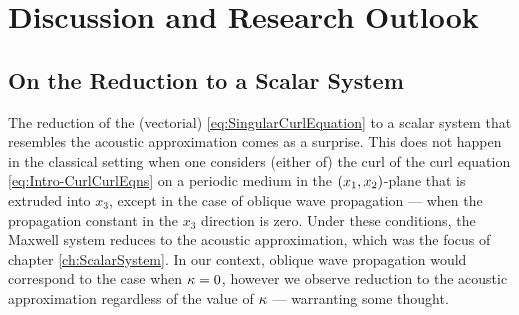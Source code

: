 \section{Discussion and Research Outlook} \label{sec:CC-Discussion}

\subsection{On the Reduction to a Scalar System} \label{ssec:ReductionToScalar}
The reduction of the (vectorial) \eqref{eq:SingularCurlEquation} to a scalar system that resembles the acoustic approximation comes as a surprise.
This does not happen in the classical setting when one considers (either of) the curl of the curl equation \eqref{eq:Intro-CurlCurlEqns} on a periodic medium in the $\left( x_1,x_2 \right)$-plane that is extruded into $x_3$, except in the case of oblique wave propagation --- when the propagation constant in the $x_3$ direction is zero.
Under these conditions, the Maxwell system reduces to the acoustic approximation, which was the focus of chapter \ref{ch:ScalarSystem}.
In our context, oblique wave propagation would correspond to the case when $\kappa=0$, however we observe reduction to the acoustic approximation regardless of the value of $\kappa$ --- warranting some thought.

